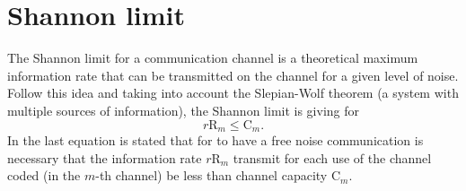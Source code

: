 \section{Shannon limit}
\label{Subsec:LimShannon}

The Shannon limit for a communication channel is a theoretical maximum information rate 
that can be transmitted on the channel for a given level of noise. Follow this idea
and taking into account the Slepian-Wolf theorem (a system with multiple sources of 
information), the Shannon limit is giving for
\begin{equation} \label{eq:RCE}
r \mathrm{R}_m \leq \mathrm{C}_m.
\end{equation}
In the last equation is stated that for to have a free noise communication 
is necessary that the information rate $r \mathrm{R}_m$ transmit for each use of the channel coded
(in the $m$-th channel) be less than channel capacity $\mathrm{C}_m$.

